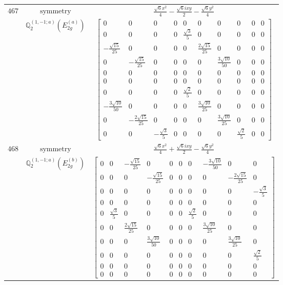 \documentclass[fleqn,8pt,landscape]{jsarticle}
\begin{document}
\begin{longtable}{ccc}
$ 467 $ & $ \text{symmetry} $ & $ \frac{\sqrt{6} x^{2}}{4} - \frac{\sqrt{6} i x y}{2} - \frac{\sqrt{6} y^{2}}{4} $ \\
$  $ & $ \mathbb{Q}_{2}^{(1,-1;a)}(E_{2g}^{(a)}) $ & $ \begin{bmatrix} 0 & 0 & 0 & 0 & 0 & 0 & 0 & 0 & 0 & 0 \\ 0 & 0 & 0 & 0 & \frac{\sqrt{3}}{5} & 0 & 0 & 0 & 0 & 0 \\ - \frac{\sqrt{15}}{25} & 0 & 0 & 0 & 0 & \frac{2 \sqrt{15}}{25} & 0 & 0 & 0 & 0 \\ 0 & - \frac{\sqrt{15}}{25} & 0 & 0 & 0 & 0 & \frac{3 \sqrt{10}}{50} & 0 & 0 & 0 \\ 0 & 0 & 0 & 0 & 0 & 0 & 0 & 0 & 0 & 0 \\ 0 & 0 & 0 & 0 & 0 & 0 & 0 & 0 & 0 & 0 \\ 0 & 0 & 0 & 0 & \frac{\sqrt{2}}{5} & 0 & 0 & 0 & 0 & 0 \\ - \frac{3 \sqrt{10}}{50} & 0 & 0 & 0 & 0 & \frac{3 \sqrt{10}}{25} & 0 & 0 & 0 & 0 \\ 0 & - \frac{2 \sqrt{15}}{25} & 0 & 0 & 0 & 0 & \frac{3 \sqrt{10}}{25} & 0 & 0 & 0 \\ 0 & 0 & - \frac{\sqrt{3}}{5} & 0 & 0 & 0 & 0 & \frac{\sqrt{2}}{5} & 0 & 0 \end{bmatrix} $ \\ \hline
$ 468 $ & $ \text{symmetry} $ & $ \frac{\sqrt{6} x^{2}}{4} + \frac{\sqrt{6} i x y}{2} - \frac{\sqrt{6} y^{2}}{4} $ \\
$  $ & $ \mathbb{Q}_{2}^{(1,-1;a)}(E_{2g}^{(b)}) $ & $ \begin{bmatrix} 0 & 0 & - \frac{\sqrt{15}}{25} & 0 & 0 & 0 & 0 & - \frac{3 \sqrt{10}}{50} & 0 & 0 \\ 0 & 0 & 0 & - \frac{\sqrt{15}}{25} & 0 & 0 & 0 & 0 & - \frac{2 \sqrt{15}}{25} & 0 \\ 0 & 0 & 0 & 0 & 0 & 0 & 0 & 0 & 0 & - \frac{\sqrt{3}}{5} \\ 0 & 0 & 0 & 0 & 0 & 0 & 0 & 0 & 0 & 0 \\ 0 & \frac{\sqrt{3}}{5} & 0 & 0 & 0 & 0 & \frac{\sqrt{2}}{5} & 0 & 0 & 0 \\ 0 & 0 & \frac{2 \sqrt{15}}{25} & 0 & 0 & 0 & 0 & \frac{3 \sqrt{10}}{25} & 0 & 0 \\ 0 & 0 & 0 & \frac{3 \sqrt{10}}{50} & 0 & 0 & 0 & 0 & \frac{3 \sqrt{10}}{25} & 0 \\ 0 & 0 & 0 & 0 & 0 & 0 & 0 & 0 & 0 & \frac{\sqrt{2}}{5} \\ 0 & 0 & 0 & 0 & 0 & 0 & 0 & 0 & 0 & 0 \\ 0 & 0 & 0 & 0 & 0 & 0 & 0 & 0 & 0 & 0 \end{bmatrix} $ \\ \hline

\end{longtable}
\end{document}
